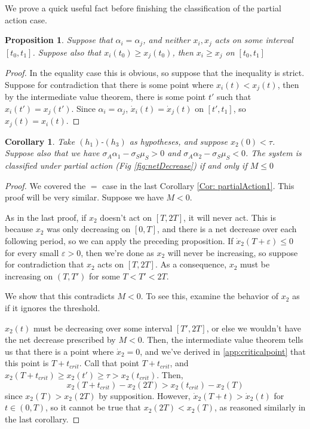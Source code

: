 \documentclass[preprint,12pt]{elsarticle}
\newcommand{\eps}{\varepsilon}
\newtheorem{prop}{Proposition}
\newtheorem{cor}{Corollary}
\begin{document}
We prove a quick useful fact before finishing the classification of the partial action case. 



\begin{prop}\label{startsHigher}
    Suppose that $\alpha_i = \alpha_j$, and neither $x_i,x_j$ acts on some interval $[t_0,t_1]$. Suppose also that $x_i(t_0) \geq x_j(t_0)$, then $x_i \geq x_j$ on $[t_0,t_1]$
\end{prop}
\begin{proof} In the equality case this is obvious, so suppose that the inequality is strict. Suppose for contradiction that there is some point where $x_i(t) <  x_j(t)$, then by the intermediate value theorem, there is some point $t'$ such that $x_i(t') = x_j(t')$. Since $\alpha_i = \alpha_j$, $\dot x_i(t) = \dot x_j(t)$ on $[t',t_1]$, so $x_j(t) = x_i(t)$. \end{proof} 

\begin{cor}\label{Cor:PartialActionFull}
Take $(h_1)$-$(h_3)$ as hypotheses, and suppose $x_2(0) < \tau$. Suppose also that we have $\sigma_A\alpha_1 - \sigma_S \mu_S > 0$ and $\sigma_A\alpha_2 - \sigma_S \mu_S < 0$. The system is classified under partial action (Fig \ref{fig:netDecrease}) if and only if  $M \leq 0$ 
\end{cor}
\begin{proof} We covered the $=$ case in the last Corollary \ref{Cor: partialAction1}. This proof will be very similar. Suppose we have $M < 0$.

As in the last proof, if $x_2$ doesn't act on $[T,2T]$, it will never act. This is because $x_2$ was only decreasing on $[0,T]$, and there is a net decrease over each following period, so we can apply the preceding proposition. If $\dot x_2(T + \eps) \leq 0$ for every small $\eps > 0$, then we're done as $x_2$ will never be increasing, so suppose for contradiction that $x_2$ acts on $[T,2T]$. As a consequence, $x_2$ must be increasing on $(T, T')$ for some $T <T' < 2T$. 

We show that this contradicts $M < 0$. To see this, examine the behavior of $x_2$ as if it ignores the threshold. 

$x_2(t)$ must be decreasing over some interval $[T', 2T]$, or else we wouldn't have the net decrease prescribed by $M< 0$. Then, the intermediate value theorem tells us that there is a point where $\dot x_2  =0$, and we've derived in \ref{app:criticalpoint} that this point is $T + t_{crit}$. Call that point $T + t_{crit}$, and $x_2(T + t_{crit}) \geq x_2(t') \geq \tau > x_2(t_{crit})$. Then, \[
x_2(T + t_{crit})- x_2(2T)  > x_2(t_{crit}) - x_2(T) 
\]
since $x_2(T) > x_2(2T)$ by supposition. However, $\dot x_2(T + t) > \dot x_2(t)$ for $t \in (0,T)$, so it cannot be true that $x_2(2T) < x_2(T)$, as reasoned similarly in the last corollary. 
\end{proof}
\end{document}
